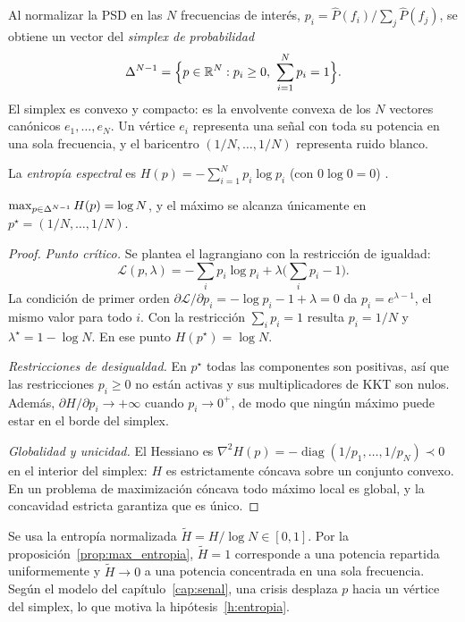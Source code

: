 Al normalizar la PSD en las $N$ frecuencias de interés, $p_i = \hat P(f_i)/\sum_j \hat P(f_j)$, se obtiene un vector del \emph{simplex de probabilidad}
\begin{equation}
\simplex = \Big\{ p\in\R^N : p_i \ge 0,\ \sum_{i=1}^N p_i = 1\Big\}.
\end{equation}
El simplex es convexo y compacto: es la envolvente convexa de los $N$ vectores canónicos $e_1,\dots,e_N$. Un vértice $e_i$ representa una señal con toda su potencia en una sola frecuencia, y el baricentro $(1/N,\dots,1/N)$ representa ruido blanco.

\begin{definicion}
La \emph{entropía espectral} es $H(p) = -\sum_{i=1}^N p_i \log p_i$ (con $0\log 0 = 0$) \parencite{inouye1991}.
\end{definicion}

\begin{proposicion}\label{prop:max_entropia}
$\max_{p\in\Delta^{N-1}} H(p) = \log N$, y el máximo se alcanza únicamente en $p^\star = (1/N,\dots,1/N)$.
\end{proposicion}
\begin{proof}
\emph{Punto crítico.} Se plantea el lagrangiano con la restricción de igualdad:
\[
\mathcal{L}(p,\lambda) = -\sum_i p_i\log p_i + \lambda\Big(\sum_i p_i - 1\Big).
\]
La condición de primer orden $\partial\mathcal{L}/\partial p_i = -\log p_i - 1 + \lambda = 0$ da $p_i = e^{\lambda-1}$, el mismo valor para todo $i$. Con la restricción $\sum_i p_i = 1$ resulta $p_i = 1/N$ y $\lambda^\star = 1 - \log N$. En ese punto $H(p^\star) = \log N$.

\emph{Restricciones de desigualdad.} En $p^\star$ todas las componentes son positivas, así que las restricciones $p_i\ge 0$ no están activas y sus multiplicadores de KKT son nulos. Además, $\partial H/\partial p_i \to +\infty$ cuando $p_i \to 0^+$, de modo que ningún máximo puede estar en el borde del simplex.

\emph{Globalidad y unicidad.} El Hessiano es $\nabla^2 H(p) = -\operatorname{diag}(1/p_1,\dots,1/p_N) \prec 0$ en el interior del simplex: $H$ es estrictamente cóncava sobre un conjunto convexo. En un problema de maximización cóncava todo máximo local es global, y la concavidad estricta garantiza que es único.
\end{proof}

Se usa la entropía normalizada $\tilde H = H/\log N\in[0,1]$. Por la proposición~\ref{prop:max_entropia}, $\tilde H = 1$ corresponde a una potencia repartida uniformemente y $\tilde H \to 0$ a una potencia concentrada en una sola frecuencia. Según el modelo del capítulo~\ref{cap:senal}, una crisis desplaza $p$ hacia un vértice del simplex, lo que motiva la hipótesis~\ref{h:entropia}.

